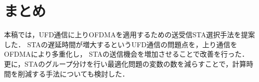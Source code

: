 \documentclass[technicalreport]{ieicej}
\begin{document}
\section{まとめ}
	本稿では，UFD通信に上りOFDMAを適用するための送受信STA選択手法を提案した．
	STAの遅延時間が増大するというUFD通信の問題点を，上り通信をOFDMAにより多重化し，
	STAの送信機会を増加させることで改善を行った．
	更に，STAのグループ分けを行い最適化問題の変数の数を減らすことで，計算時間を削減する手法についても検討した．



\end{document}
